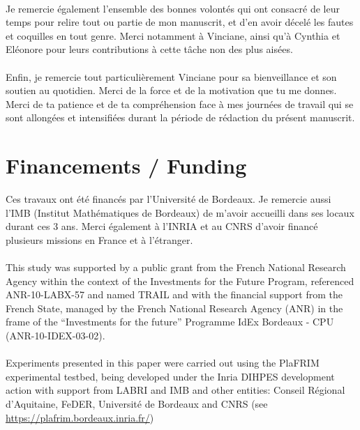 \paragraph{}
Je remercie également l'ensemble des bonnes volontés qui ont consacré de leur temps pour relire tout ou partie de mon manuscrit, et d'en avoir décelé les fautes et coquilles en tout genre. 
Merci notamment à Vinciane, ainsi qu'à Cynthia et Eléonore pour leurs contributions à cette tâche non des plus aisées.

\paragraph{}
Enfin, je remercie tout particulièrement Vinciane pour sa bienveillance et son soutien au quotidien. 
Merci de la force et de la motivation que tu me donnes. 
Merci de ta patience et de ta compréhension face à mes journées de travail qui se sont allongées et intensifiées durant la période de rédaction du présent manuscrit. 

\vfill
\myhrule
\vspace*{5mm}
\section*{\large Financements / Funding}
Ces travaux ont été financés par l'Université de Bordeaux. 
Je remercie aussi l'IMB (Institut Mathématiques de Bordeaux) de m'avoir accueilli dans ses locaux durant ces 3 ans. 
Merci également à l'INRIA et au CNRS d'avoir financé plusieurs missions en France et à l'étranger.


\paragraph{}
This study was supported by a public grant from the French National Research
Agency within the context of the Investments for the Future Program, referenced ANR-10-LABX-57 and named TRAIL
and with the financial support from the French State, managed by the French National Research Agency (ANR) in the frame of the ``Investments for the future'' Programme IdEx Bordeaux - CPU (ANR-10-IDEX-03-02).


\paragraph{}
Experiments presented in this paper were carried out using the PlaFRIM experimental testbed,
being developed under the Inria DIHPES development action with support from LABRI and
IMB and other entities: Conseil Régional d’Aquitaine, FeDER, Université de Bordeaux and
CNRS (see \url{https://plafrim.bordeaux.inria.fr/})

\vspace{15mm}
